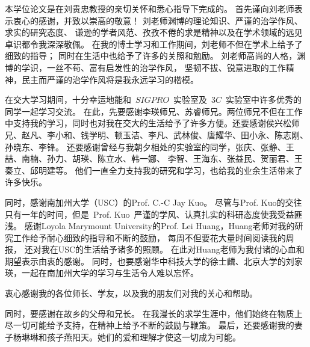 \par 本学位论文是在刘贵忠教授的亲切关怀和悉心指导下完成的。 首先谨向刘老师表示衷心的感谢，并致以崇高的敬意！
刘老师渊博的理论知识、严谨的治学作风、求实的研究态度、
谦逊的学者风范、孜孜不倦的求是精神以及在学术领域的远见卓识都令我深深敬佩。
在我的博士学习和工作期间，刘老师不但在学术上给予了细致的指导； 同时在生活中也给予了许多的关照和勉励。
刘老师高尚的人格，渊博的学识，一丝不苟、富有启发性的治学作风，
坚韧不拔、锐意进取的工作精神，民主而严谨的治学作风将是我永远学习的楷模。

\par 在交大学习期间，十分幸运地能和~$SIGPRO$~实验室及~$3C$~实验室中许多优秀的同学一起学习交流。
在此，先要感谢李瑛师兄、苏睿师兄。两位师兄不但在工作中支持我的学习，同时也对我在交大的生活给予了许多方便。还要感谢侯兴松师兄、赵凡、李小和、钱学明、顿玉洁、李凡、武林俊、唐耀华、田小永、陈志刚、孙晓东、李锋。
还要感谢曾经与我朝夕相处的实验室的同学，张庆、张静、王喆、南楠、孙力、胡瑛、陈立水、韩一娜、
李智、王海东、张益民、贺丽君、王秦立、邱明建等。
他们一直全力支持我的研究和学习，也给我的业余生活带来了许多快乐。

\par 同时，感谢南加州大学（USC）的Prof. C.-C Jay Kuo。
尽管与Prof. Kuo的交往只有一年的时间，但是~Prof. Kuo~严谨的学风、认真扎实的科研态度使我受益匪浅。
感谢Loyola Marymount University的Prof. Lei Huang，Huang老师对我的研究工作给予耐心细致的指导和不断的鼓励，
每周不但要花大量时间阅读我的周报，
还对我在USC的生活给予诸多的照顾。
在此对Huang老师为我付诸的心血和期望表示由衷的感谢。
同时，也要感谢华中科技大学的徐士麟、北京大学的刘家瑛，一起在南加州大学的学习与生活令人难以忘怀。

\par 衷心感谢我的各位师长、学友，以及我的朋友们对我的关心和帮助。 
\par 同时，要感谢在故乡的父母和兄长。 在我漫长的求学生涯中，他们始终在物质上尽一切可能给予支持，在精神上给予不断的鼓励与鞭策。 最后，还要感谢我的妻子杨琳琳和孩子燕阳天。她们的爱和理解才使这一切成为可能。
